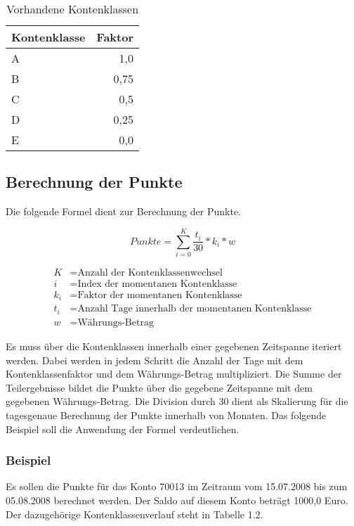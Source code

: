 \documentclass[12pt]{scrreprt}
\begin{document}
\begin{table}
  \begin{center}
    \begin{tabular}{|l|r|}
      \hline
      \textbf{Kontenklasse} & \textbf{Faktor}\\
      \hline
      A & 1,0\\
      \hline
      B & 0,75\\
      \hline
      C & 0,5\\
      \hline
      D & 0,25\\
      \hline
      E & 0,0\\
      \hline
    \end{tabular}
    \caption{Vorhandene Kontenklassen}
  \end{center}
\end{table}
\vspace{2mm}

\subsection{Berechnung der Punkte}
Die folgende Formel dient zur Berechnung der Punkte. 

\begin{equation*}
  Punkte = \sum_{i=0}^{K} \frac{t_i}{30} * k_i * w
\end{equation*}

\begin{align*}
 K &= \text{Anzahl der Kontenklassenwechsel} \\
 i &= \text{Index der momentanen Kontenklasse} \\
 k_i &= \text{Faktor der momentanen Kontenklasse} \\
 t_i &= \text{Anzahl Tage innerhalb der momentanen Kontenklasse} \\
 w &= \text{Währungs-Betrag} 
\end{align*}

Es muss über die Kontenklassen innerhalb einer gegebenen Zeitspanne iteriert werden. Dabei werden in jedem Schritt die Anzahl der Tage mit dem Kontenklassenfaktor und dem Währungs-Betrag multipliziert. Die Summe der Teilergebnisse bildet die Punkte über die gegebene Zeitspanne mit dem gegebenen Währungs-Betrag. Die Division durch 30 dient als Skalierung für die tagesgenaue Berechnung der Punkte innerhalb von Monaten. Das folgende Beispiel soll die Anwendung der Formel verdeutlichen.

\subsubsection{Beispiel}
Es sollen die Punkte für das Konto 70013 im Zeitraum vom 15.07.2008 bis zum 05.08.2008 berechnet werden. Der Saldo auf diesem Konto beträgt 1000,0 Euro. Der dazugehörige Kontenklassenverlauf steht in Tabelle 1.2.
\end{document}
